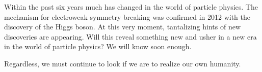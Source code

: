 


Within the past six years much has changed in the world of particle physics. The mechanism for electroweak symmetry
breaking was confirmed in 2012 with the discovery of the Higgs boson. At this very moment, tantalizing hints
of new discoveries are appearing. Will this reveal something new and usher in a new era in the 
world of particle physics? We will know soon enough.

Regardless, we must continue to look if we are to realize our own humanity.









